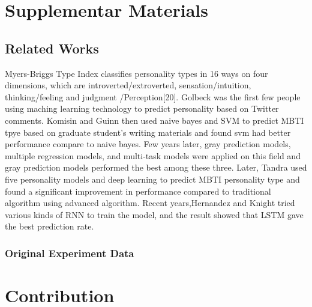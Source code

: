 \documentclass{article}
\begin{document}
 
\section{Supplementar Materials}

\subsection{Related Works}
 Myers-Briggs Type Index classifies personality types in 16 ways on four dimensions, which are introverted/extroverted,  sensation/intuition, thinking/feeling and judgment /Perception[20]. Golbeck was the first few people using maching learning technology to predict personality based on Twitter comments. Komisin and Guinn then used naive bayes and SVM to predict MBTI tpye based on graduate student's writing materials and found svm had better performance compare to naive bayes. Few years later, gray prediction models, multiple regression models, and multi-task models were applied on this field and gray prediction models performed the best among these three. Later, Tandra used five personality models and deep learning to predict MBTI personality type and found a significant improvement in performance compared to traditional algorithm using advanced algorithm. Recent years,Hernandez and Knight tried various kinds of RNN to train the model, and the result showed that LSTM gave the best prediction rate.
 
\subsubsection{Original Experiment Data}

\section{Contribution}
\end{document}
